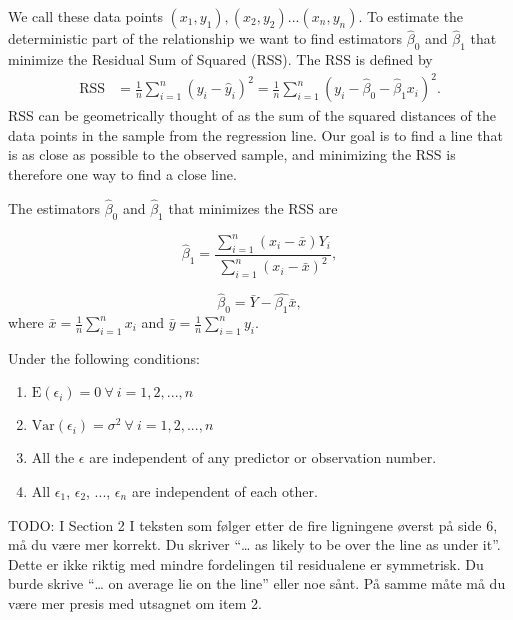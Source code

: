 \documentclass{article}
\begin{document}
We call these data points \((x_1, y_1), (x_2, y_2)
... (x_n, y_n)\). To estimate the deterministic part of the relationship we want
to find estimators \(\hat{\beta}_0\) and \(\hat{\beta}_1\) that minimize the
Residual Sum of Squared (RSS). The RSS is defined by
\begin{align*}
  \mathrm{RSS} &= \frac{1}{n} \sum_{i = 1}^n \left( y_i - \hat{y}_i \right)^2 
  = \frac{1}{n} \sum_{i = 1}^n \left( y_i - \hat{\beta}_0 - \hat{\beta}_1 x_i \right)^2.
\end{align*}
RSS can be geometrically thought of as the sum of the squared distances of
the data points in the sample from the regression line. Our goal is to find a
line that is as close as possible to the observed sample, and minimizing the RSS
is therefore one way to find a close line.

The estimators \(\hat{\beta}_0\) and \(\hat{\beta}_1\) that minimizes the RSS are

\begin{equation*}
 \hat{\beta}_1 = \frac{\sum_{i = 1}^n\left( x_i - \bar{x} \right) Y_i}{\sum_{i = 1}^n\left( x_i - \bar{x} \right)^2} ,
\end{equation*}

\begin{equation*}
 \hat{\beta}_0 = \bar{Y} - \hat{\beta_1}\bar{x},
\end{equation*}
where \(\bar{x} = \frac{1}{n} \sum_{i = 1}^n x_i\) and \(\bar{y} = \frac{1}{n} \sum_{i = 1}^n y_i\).

Under the following conditions:

\begin{enumerate}
\item \(\mathrm{E} \left( \epsilon_i \right) = 0\ \forall \ i = 1, 2, ..., n\)
\item \(\mathrm{Var} \left( \epsilon_i \right) = \sigma^2\ \forall \ i = 1, 2, ..., n\)
\item All the \(\epsilon\) are independent of any predictor or observation number.
\item All \(\epsilon_1\), \(\epsilon_2\), ..., \(\epsilon_n\) are independent of each other.
\end{enumerate}

TODO: I Section 2 I teksten som følger etter de fire ligningene øverst på side 6, må du være mer korrekt. Du skriver “… as likely to be over the line as under it”. Dette er ikke riktig med mindre fordelingen til residualene er symmetrisk. Du burde skrive “… on average lie on the line” eller noe sånt. På samme måte må du være mer presis med utsagnet om item 2.
\end{document}
